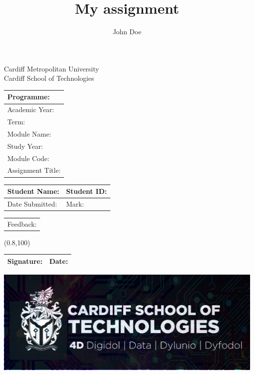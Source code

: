 \documentclass{article}
\begin{document}
\title{My assignment}
\author{John Doe}

\begin{center}
    {\huge Cardiff Metropolitan University} \\
    {\large Cardiff School of Technologies} \\

    \vspace{5mm}

    \begin{tabularx}{ 0.8\textwidth } {
          | >{\raggedright\arraybackslash}X | }
        \hline
        Programme: \\
        \hline
        Academic Year: \\
        \hline
        Term: \\
        \hline
        Module Name: \\
        \hline
        Study Year: \\
        \hline
        Module Code: \\
        \hline
        Assignment Title: \\
        \hline
    \end{tabularx}

    \begin{tabularx}{ 0.8\textwidth } {
          | >{\raggedright\arraybackslash}X 
          | >{\raggedright\arraybackslash}X | }
        Student Name: & Student ID: \\
        \hline
        Date Submitted: & Mark: \\
        \hline
    \end{tabularx}

    \begin{tabularx}{ 0.8\textwidth } {
        | >{\raggedright\arraybackslash}X | }
        Feedback: \\
    \end{tabularx}

    \framebox(0.8\textwidth,100){} %

    \begin{tabularx}{ 0.8\textwidth } {
          | >{\raggedright\arraybackslash}X 
          | >{\raggedright\arraybackslash}X | }
        \hline
        Signature: & Date: \\
        \hline
    \end{tabularx}

    \vspace{2mm}

    \includegraphics[scale=1.75]{cst} %
\end{center}
\end{document}
